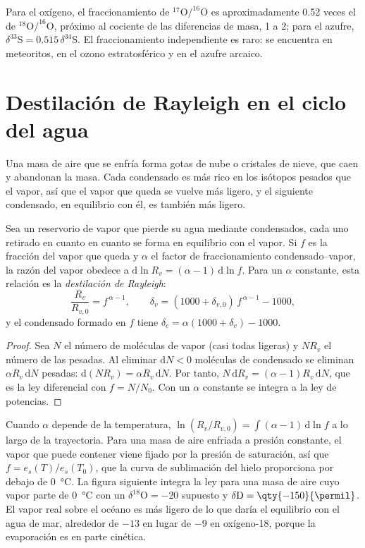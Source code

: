 Para el oxígeno, el fraccionamiento de $^{17}\mathrm O/^{16}\mathrm O$ es aproximadamente 0.52 veces el de
$^{18}\mathrm O/^{16}\mathrm O$, próximo al cociente de las diferencias de masa, 1 a 2;
para el azufre, $\delta^{33}\mathrm S = 0.515\,\delta^{34}\mathrm S$. El fraccionamiento independiente
es raro: se encuentra en meteoritos, en el ozono estratosférico y
en el azufre arcaico.

\section{Destilación de Rayleigh en el ciclo del agua}\label{sec:b3:stable-isotopes:rayleigh}

Una masa de aire que se enfría forma gotas de nube o cristales de nieve, que caen y
abandonan la masa. Cada condensado es más rico en los isótopos pesados que el vapor, así que el
vapor que queda se vuelve más ligero, y el siguiente condensado, en equilibrio con él, es
también más ligero.

\begin{proposition}\label{prop:b3:stable-isotopes:rayleigh-distillation}
Sea un reservorio de vapor que pierde su agua mediante condensados, cada uno retirado en cuanto
en cuanto se forma en equilibrio con el vapor. Si $f$ es la fracción del
vapor que queda y $\alpha$ el factor de fraccionamiento condensado--vapor, la
razón del vapor obedece a $\mathrm d\ln R_v = (\alpha - 1)\,\mathrm d\ln f$. Para
un $\alpha$ constante, esta relación es la \emph{destilación
de Rayleigh}:
\[
\frac{R_v}{R_{v,0}} = f^{\,\alpha - 1}, \qquad
\delta_v = (1000 + \delta_{v,0})\,f^{\,\alpha - 1} - 1000,
\]
y el condensado formado en $f$ tiene $\delta_c = \alpha(1000 + \delta_v) - 1000$.
\end{proposition}

\begin{proof}
Sea $N$ el número de moléculas de vapor (casi todas ligeras) y $N R_v$
el número de las pesadas. Al eliminar $\mathrm dN < 0$ moléculas de condensado
se eliminan $\alpha R_v\,\mathrm dN$ pesadas: $\mathrm d(NR_v) = \alpha
R_v\,\mathrm dN$. Por tanto, $N\,\mathrm dR_v = (\alpha - 1)R_v\,\mathrm dN$, que es la
ley diferencial con $f = N/N_0$. Con un $\alpha$ constante se integra
a la ley de potencias.
\end{proof}

Cuando $\alpha$ depende de la temperatura, $\ln(R_v/R_{v,0}) = \int(\alpha - 1)\,
\mathrm d\ln f$ a lo largo de la trayectoria. Para una masa de aire enfriada a presión constante,
el vapor que puede contener viene fijado por la presión de saturación, así que $f =
e_s(T)/e_s(T_0)$, que la curva de sublimación del hielo proporciona por debajo de
\qty{0}{\celsius}. La figura siguiente integra la ley para una masa de aire cuyo
vapor parte de \qty{0}{\celsius} con un $\delta^{18}\mathrm O = -20$ supuesto
y $\delta\mathrm D = \qty{-150}{\permil}$. El vapor real sobre el océano es
más ligero de lo que daría el equilibrio con el agua de mar, alrededor de $-13$ en lugar de
\qty{-9}{\permil} en oxígeno-18, porque la evaporación es en parte cinética.

